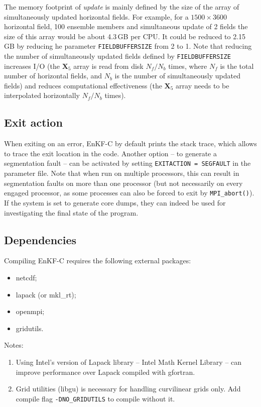 \documentclass[11pt]{report}
\newcommand{\mb} {\mathbf}
\begin{document}
The memory footprint of \emph{update} is mainly defined by the size of the array of simultaneously updated horizontal fields.
For example, for a $1500 \times 3600$ horizontal field, 100 ensemble members and simultaneous update of 2 fields the size of this array would be about 4.3\,GB per CPU.
It could be reduced to 2.15\,GB by reducing he parameter \verb|FIELDBUFFERSIZE| from 2 to 1.
Note that reducing the number of simultaneously updated fields defined by \verb|FIELDBUFFERSIZE| increases I/O (the $\mb X_5$ array is read from disk $N_f / N_b$ times, where $N_f$ is the total number of horizontal fields, and $N_b$ is the number of simultaneously updated fields) and reduces computational effectiveness (the $\mb X_5$ array needs to be interpolated horizontally $N_f / N_b$ times).

\subsection{Exit action}

When exiting on an error, EnKF-C by default prints the stack trace, which allows to trace the exit location in the code.
Another option -- to generate a segmentation fault -- can be activated by setting \verb|EXITACTION = SEGFAULT| in the parameter file.
Note that when run on multiple processors, this can result in segmentation faults on more than one processor (but not necessarily on every engaged processor, as some processes can also be forced to exit by \verb|MPI_abort()|).
If the system is set to generate core dumps, they can indeed be used for investigating the final state of the program.

\subsection{Dependencies}

Compiling EnKF-C requires the following external packages:

\begin{itemize}
\item netcdf;
\item lapack (or mkl\_rt);
\item openmpi;
\item gridutils.
\end{itemize}

Notes:
\begin{enumerate}
\item Using Intel's version of Lapack library -- Intel Math Kernel Library -- can improve performance over Lapack compiled with gfortran.
\item Grid  utilities (libgu) is necessary for handling curvilinear grids only.
Add compile flag \verb|-DNO_GRIDUTILS| to compile without it.
\end{enumerate}
\end{document}
